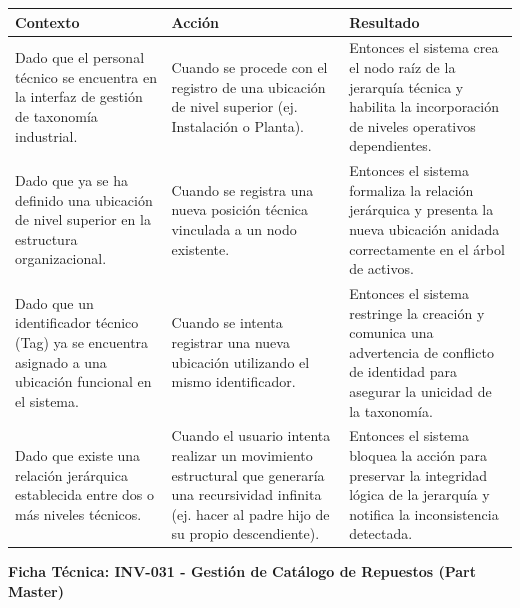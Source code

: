 \footnotesize\begin{longtable}{|p{0.28\textwidth}|p{0.32\textwidth}|p{0.34\textwidth}|}\hline
\textbf{Contexto} & \textbf{Acción} & \textbf{Resultado} \\ \hline
\parbox[t]{\linewidth}{Dado que el personal técnico se encuentra en la interfaz de gestión de taxonomía industrial.} & \parbox[t]{\linewidth}{Cuando se procede con el registro de una ubicación de nivel superior (ej. Instalación o Planta).} & \parbox[t]{\linewidth}{Entonces el sistema crea el nodo raíz de la jerarquía técnica y habilita la incorporación de niveles operativos dependientes.} \\ \hline
\parbox[t]{\linewidth}{Dado que ya se ha definido una ubicación de nivel superior en la estructura organizacional.} & \parbox[t]{\linewidth}{Cuando se registra una nueva posición técnica vinculada a un nodo existente.} & \parbox[t]{\linewidth}{Entonces el sistema formaliza la relación jerárquica y presenta la nueva ubicación anidada correctamente en el árbol de activos.} \\ \hline
\parbox[t]{\linewidth}{Dado que un identificador técnico (Tag) ya se encuentra asignado a una ubicación funcional en el sistema.} & \parbox[t]{\linewidth}{Cuando se intenta registrar una nueva ubicación utilizando el mismo identificador.} & \parbox[t]{\linewidth}{Entonces el sistema restringe la creación y comunica una advertencia de conflicto de identidad para asegurar la unicidad de la taxonomía.} \\ \hline
\parbox[t]{\linewidth}{Dado que existe una relación jerárquica establecida entre dos o más niveles técnicos.} & \parbox[t]{\linewidth}{Cuando el usuario intenta realizar un movimiento estructural que generaría una recursividad infinita (ej. hacer al padre hijo de su propio descendiente).} & \parbox[t]{\linewidth}{Entonces el sistema bloquea la acción para preservar la integridad lógica de la jerarquía y notifica la inconsistencia detectada.} \\ \hline
\end{longtable}\normalsize
\vspace{1em}
\noindent\textbf{Ficha Técnica: INV-031 - Gestión de Catálogo de Repuestos (Part Master)}
\footnotesize\setlength{\tabcolsep}{4pt}\renewcommand{\arraystretch}{1.2}
